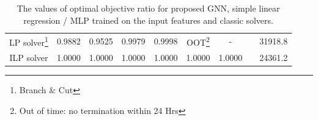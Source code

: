 \documentclass{beamer}
\begin{document}
\begin{frame}
\begin{table}
{\begin{tabular}{|c|*{6}{c}|cc|}
                LP solver\footnote{Branch \& Cut}   & 0.9882                                      & 0.9525                                    & 0.9979  & 0.9998 & OOT\footnote{Out of time: no termination within 24 Hrs} & -      &     & 31918.8 \\
                ILP solver                          & 1.0000                                      & 1.0000                                    & 1.0000  & 1.0000 & 1.0000                                                  & 1.0000 &     & 24361.2 \\
                \hline
            \end{tabular}
        }
        \caption{The values of optimal objective ratio for proposed
            GNN, simple linear regression / MLP trained on the input features
            and classic solvers.}
    \end{table}

\end{frame}
\end{document}
